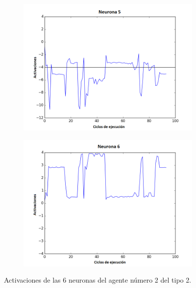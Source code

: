 \begin{figure}[!h]
\begin{subfigure}{0.33\textwidth}
  \includegraphics[width=\linewidth]{Imagenes/Agente2Activaciones/Agente1/Neurona4}
\end{subfigure}\hfil %
\begin{subfigure}{0.33\textwidth}
  \includegraphics[width=\linewidth]{Imagenes/Agente2Activaciones/Agente1/Neurona5}
\end{subfigure}
\caption{Activaciones de las 6 neuronas del agente número 2 del tipo 2.}
\end{figure}

